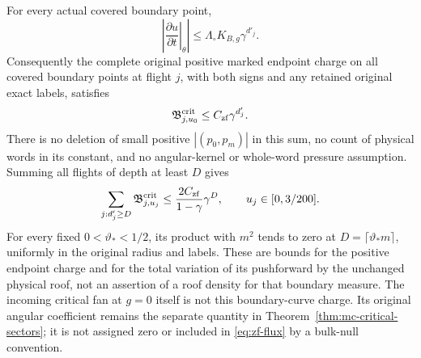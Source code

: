 \begin{theorem}
\label{thm:zf-flux}
For every actual covered boundary point,
\begin{equation}\label{eq:zf-speed}
 \left|\left.\frac{\partial u}{\partial t}\right|_\theta\right|
                    \le\Lambda_\circ K_{B,g}\gamma^{d'_j}.
\end{equation}
Consequently the complete original positive marked endpoint charge
on all covered boundary points at flight $j$, with both signs and
any retained original exact labels, satisfies
\begin{equation}\label{eq:zf-flux}
 \mathfrak B^{\rm crit}_{j,u_0}
                    \le C_{\rm zf}\gamma^{d'_j}.
\end{equation}
There is no deletion of small positive $|(p_0,p_m)|$ in this sum,
no count of physical words in its constant, and no angular-kernel or
whole-word pressure assumption.  Summing all flights of depth at
least $D$ gives
\begin{equation}\label{eq:zf-deep}
 \sum_{j:d'_j\ge D}\mathfrak B^{\rm crit}_{j,u_j}
           \le\frac{2C_{\rm zf}}{1-\gamma}\gamma^D,
 \qquad u_j\in[0,3/200].
\end{equation}
For every fixed $0<\vartheta_*<1/2$, its product with $m^2$ tends
to zero at $D=\lceil\vartheta_*m\rceil$, uniformly in the original
radius and labels.  These are bounds for the positive endpoint
charge and for the total variation of its pushforward by the
unchanged physical roof, not an assertion of a roof density for
that boundary measure.
The incoming critical fan at $g=0$ itself is not this boundary-curve
charge.  Its original angular coefficient remains the separate
quantity in Theorem~\ref{thm:mc-critical-sectors}; it is not assigned
zero or included in \eqref{eq:zf-flux} by a bulk-null convention.
\end{theorem}
